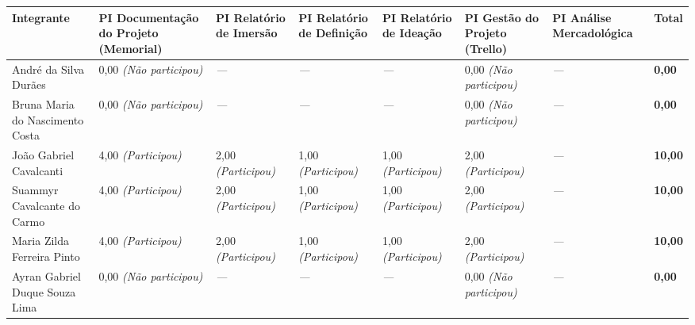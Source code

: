 \documentclass[
  sigconf,
  nonacm, %
  language=portuguese
]{acmart}
\begin{document}
\begin{tabularx}{\linewidth}{@{} X X X X X X X p{2.5cm} @{}}
\toprule
\textbf{Integrante} & \textbf{\small PI Documentação do Projeto (Memorial)} & \textbf{\small PI Relatório de Imersão} & \textbf{\small PI Relatório de Definição} & \textbf{\small PI Relatório de Ideação} & \textbf{\small PI Gestão do Projeto (Trello)} & \textbf{\small PI Análise Mercadológica} & \textbf{Total} \\
\midrule
André da Silva Durães & 0,00 \textit{(Não participou)} & \textit{---} & \textit{---} & \textit{---} & 0,00 \textit{(Não participou)} & \textit{---} & \textbf{0,00} \\
Bruna Maria do Nascimento Costa & 0,00 \textit{(Não participou)} & \textit{---} & \textit{---} & \textit{---} & 0,00 \textit{(Não participou)} & \textit{---} & \textbf{0,00} \\
João Gabriel Cavalcanti & 4,00 \textit{(Participou)} & 2,00 \textit{(Participou)} & 1,00 \textit{(Participou)} & 1,00 \textit{(Participou)} & 2,00 \textit{(Participou)} & \textit{---} & \textbf{10,00} \\
Suammyr Cavalcante do Carmo & 4,00 \textit{(Participou)} & 2,00 \textit{(Participou)} & 1,00 \textit{(Participou)} & 1,00 \textit{(Participou)} & 2,00 \textit{(Participou)} & \textit{---} & \textbf{10,00} \\
Maria Zilda Ferreira Pinto & 4,00 \textit{(Participou)} & 2,00 \textit{(Participou)} & 1,00 \textit{(Participou)} & 1,00 \textit{(Participou)} & 2,00 \textit{(Participou)} & \textit{---} & \textbf{10,00} \\
Ayran Gabriel Duque Souza Lima & 0,00 \textit{(Não participou)} & \textit{---} & \textit{---} & \textit{---} & 0,00 \textit{(Não participou)} & \textit{---} & \textbf{0,00} \\
\bottomrule
\end{tabularx}
\end{document}
